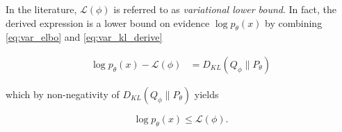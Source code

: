 \documentclass[11pt]{article}
\theoremstyle{plain}
\theoremstyle{definition}
\theoremstyle{plain}
\begin{document}
\noindent In the literature, $\mathcal{L}(\phi)$ is referred to as
\textit{variational lower bound}. In fact, the derived expression
is a lower bound on evidence $\log p_{\theta}(x)$ by combining \eqref{eq:var_elbo}
and \eqref{eq:var_kl_derive}

\begin{equation}
\begin{aligned}\log p_{\theta}(x)-\mathcal{L}(\phi) & =D_{KL}(Q_{\phi}\rVert P_{\theta})\end{aligned}
\end{equation}

\noindent which by non-negativity of $D_{KL}(Q_{\phi}\rVert P_{\theta})$
yields

\begin{equation}
\log p_{\theta}(x)\leq\mathcal{L}(\phi).
\end{equation}
\end{document}
